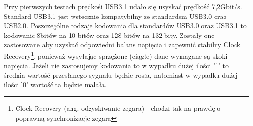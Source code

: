 \documentclass{BscUS}
\begin{document}
\newline
Przy pierwszych testach prędkośi USB3.1 udało się uzyskać prędkość 7,2Gbit/s.
\newline
Standard USB3.1 jest wstecznie kompatybilny ze standardem USB3.0 oraz USB2.0.
\cite{USB30Doc}
\newline
\indent Poszczególne rodzaje kodowania dla standardów USB3.0 oraz USB3.1 to kodowanie 8bitów na 10 bitów oraz 128 bitów na 132 bity. Zostały one zastosowane aby uzyskać odpowiedni balans napięcia i zapewnić stabilny Clock Recovery\footnote{Clock Recovery (ang. odzyskiwanie zegara) - chodzi tak na prawdę o poprawną synchronizacje zegara}, ponieważ wysyłając sprzężone (ciągłe) dane wymagane są skoki napięcia. Jeżeli nie zastosujemy kodowania to w wypadku dużej ilości '1' to średnia wartość przesłanego sygnału będzie rosła, natomiast w wypadku dużej ilości '0' wartość ta będzie malała.
\end{document}
